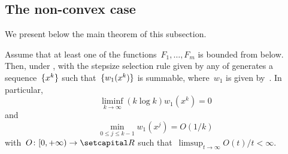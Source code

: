 \documentclass[../../main]{subfiles}
\begin{document}
\subsection{The non-convex case}
We present below the main theorem of this subsection.
\begin{theorem} 
    Assume that at least one of the functions~$F_1, \dots, F_m$ is bounded from below.
    Then, under ,  with the stepsize selection rule given by any of  generates a sequence~$\lbrace x^k\rbrace$ such that~$\lbrace w_1(x^k)\rbrace$ is summable, where~$w_1$ is given by~.
    In particular,
    \begin{equation}
        \liminf_{k \to \infty} (k \log k) w_1(x^k) = 0
    \end{equation} 
    and
    \begin{equation}
        \min_{0 \le j \le k - 1} w_1(x^j) = O(1 / k)
    \end{equation} 
    with~$O \colon [0, + \infty) \to \setR$ such that~$\limsup_{t \to \infty} O(t) / t < \infty$.
\end{theorem}
\end{document}
